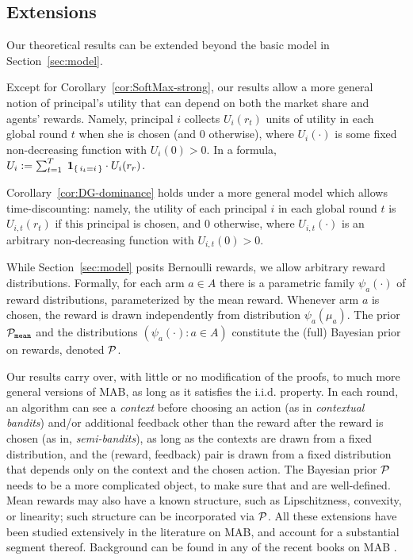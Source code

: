 \subsection{Extensions}
\label{sec:theory-extensions}

Our theoretical results can be extended beyond the basic model in Section~\ref{sec:model}.


Except for Corollary~\ref{cor:SoftMax-strong}, our results allow a more general notion of principal's utility that can depend on both the market share and agents' rewards. Namely, principal $i$ collects $U_i(r_t)$ units of utility in each global round $t$ when she is chosen (and $0$ otherwise), where $U_i(\cdot)$ is some fixed non-decreasing function with $U_i(0)>0$. In a formula,
$U_i := \sum_{t=1}^T\; {\bf 1}_{\left\{\,i_t=i\,\right\}}\cdot U_i(r_r)$.

Corollary~\ref{cor:DG-dominance} holds under a more general model which allows time-discounting: namely, the utility of each principal $i$ in each global round $t$ is $U_{i,t}(r_t)$ if this principal is chosen, and $0$ otherwise, where $U_{i,t}(\cdot)$ is an arbitrary non-decreasing function with $U_{i,t}(0)>0$.

While Section~\ref{sec:model} posits Bernoulli rewards, we allow arbitrary reward distributions. Formally, for each arm $a\in A$ there is a parametric family $\psi_a(\cdot)$ of reward distributions, parameterized by the mean reward. Whenever arm $a$ is chosen, the reward is drawn independently from distribution $\psi_a(\mu_a)$. The prior $\mathcal{P}_\mathtt{mean}$ and the distributions $(\psi_a(\cdot)\colon a\in A)$ constitute the (full) Bayesian prior on rewards, denoted $\mathcal{P}$.

 Our results carry over, with little or no modification of the proofs, to much more general versions of MAB, as long as it satisfies the i.i.d. property. In each round, an algorithm can see a \emph{context} before choosing an action (as in \emph{contextual bandits}) and/or additional feedback other than the reward after the reward is chosen (as in, \eg \emph{semi-bandits}), as long as the contexts are drawn from a fixed distribution, and the (reward, feedback) pair is drawn from a fixed distribution that depends only on the context and the chosen action. The Bayesian prior $\mathcal{P}$ needs to be a more complicated object, to make sure that \PMR and \BIR are well-defined. Mean rewards may also have a known structure, such as Lipschitzness, convexity, or linearity; such structure can be incorporated via $\mathcal{P}$. All these extensions have been studied extensively in the literature on MAB, and account for a substantial segment thereof. Background can be found in any of the recent books on MAB \citep{Bubeck-survey12,slivkins-MABbook,LS19bandit-book}.


